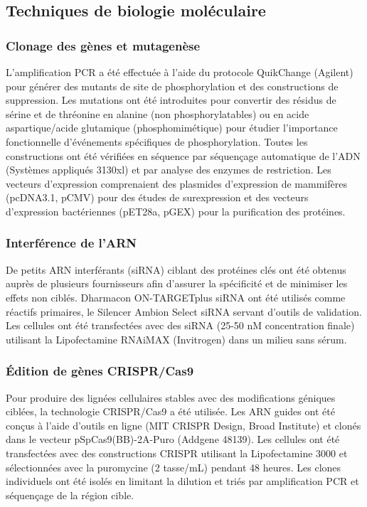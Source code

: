 \documentclass[11pt,a4paper]{article}
\begin{document}
\subsection{Techniques de biologie moléculaire}

\subsubsection{Clonage des gènes et mutagenèse}

L'amplification PCR a été effectuée à l'aide du protocole QuikChange (Agilent) pour générer des mutants de site de phosphorylation et des constructions de suppression. Les mutations ont été introduites pour convertir des résidus de sérine et de thréonine en alanine (non phosphorylatables) ou en acide aspartique/acide glutamique (phosphomimétique) pour étudier l'importance fonctionnelle d'événements spécifiques de phosphorylation. Toutes les constructions ont été vérifiées en séquence par séquençage automatique de l'ADN (Systèmes appliqués 3130xl) et par analyse des enzymes de restriction. Les vecteurs d'expression comprenaient des plasmides d'expression de mammifères (pcDNA3.1, pCMV) pour des études de surexpression et des vecteurs d'expression bactériennes (pET28a, pGEX) pour la purification des protéines.

\subsubsection{Interférence de l'ARN}

De petits ARN interférants (siRNA) ciblant des protéines clés ont été obtenus auprès de plusieurs fournisseurs afin d'assurer la spécificité et de minimiser les effets non ciblés. Dharmacon ON-TARGETplus siRNA ont été utilisés comme réactifs primaires, le Silencer Ambion Select siRNA servant d'outils de validation. Les cellules ont été transfectées avec des siRNA (25-50 nM concentration finale) utilisant la Lipofectamine RNAiMAX (Invitrogen) dans un milieu sans sérum.

\subsubsection{Édition de gènes CRISPR/Cas9}

Pour produire des lignées cellulaires stables avec des modifications géniques ciblées, la technologie CRISPR/Cas9 a été utilisée. Les ARN guides ont été conçus à l'aide d'outils en ligne (MIT CRISPR Design, Broad Institute) et clonés dans le vecteur pSpCas9(BB)-2A-Puro (Addgene 48139). Les cellules ont été transfectées avec des constructions CRISPR utilisant la Lipofectamine 3000 et sélectionnées avec la puromycine (2 tasse/mL) pendant 48 heures. Les clones individuels ont été isolés en limitant la dilution et triés par amplification PCR et séquençage de la région cible.
\end{document}
